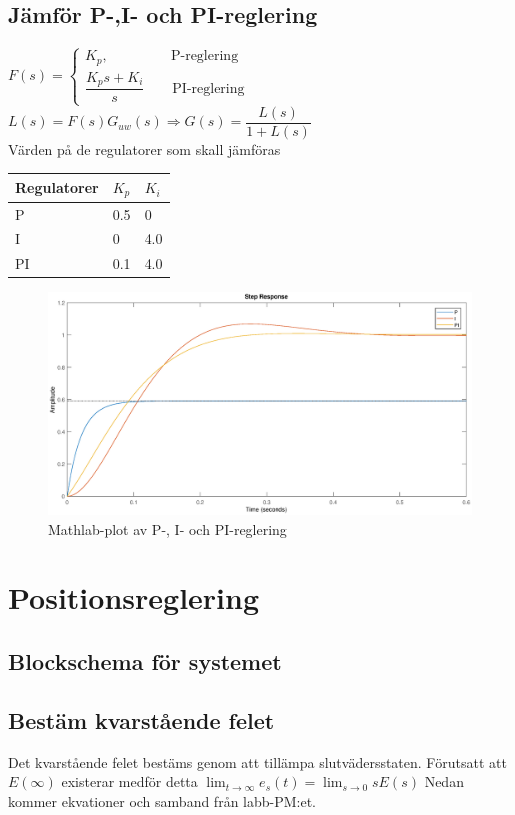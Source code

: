 \documentclass[11pt]{article}
\begin{document}
\subsection{Jämför P-,I- och PI-reglering}
$
F(s)=
\begin{cases}
K_p, \quad \quad \quad \quad \ \ 
 \text{P-reglering} \\[0.5em]
\dfrac{K_ps+K_i}{s} \quad \quad \text{PI-reglering}
\end{cases}
$
$L(s)=F(s)G_{uw}(s)\Rightarrow G(s)=\dfrac{L(s)}{1+L(s)}$\\[0.5em]
Värden på de regulatorer som skall jämföras\\[1em]
\begin{tabular}{|l|l|l|}
\hline
Regulatorer&$K_p$&$K_i$ \\ \hline \hline
P&0.5&0 \\ \hline
I&0&4.0 \\ \hline
PI&0.1&4.0 \\ \hline
\end{tabular}
\begin{figure}[h!]
\centering
\includegraphics[scale=0.45]{Figures/plot1}
\caption{Mathlab-plot av P-, I- och PI-reglering}
\end{figure}
\section{Positionsreglering}
\subsection{Blockschema för systemet}

\subsection{Bestäm kvarstående felet}
Det kvarstående felet bestäms genom att tillämpa slutvädersstaten. Förutsatt att $E(\infty)$ existerar medför detta $\lim_{t \to \infty}e_s(t) = \lim_{s \to 0}sE(s)$ Nedan kommer ekvationer och samband från labb-PM:et.
\end{document}
